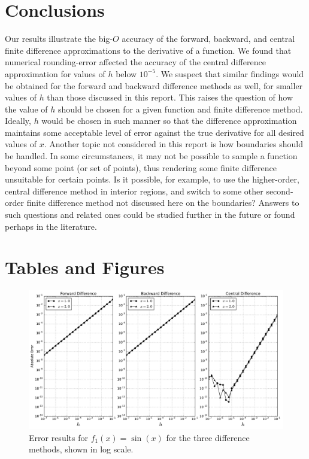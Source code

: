 \documentclass[11pt]{article}
\begin{document}
\section{Conclusions}

Our results illustrate the big-$O$ accuracy of the forward, backward, and central finite difference approximations to the derivative of a function. We found that numerical rounding-error affected the accuracy of the  central difference approximation for values of $h$ below $10^{-5}$. We suspect that similar findings would be obtained for the forward and backward difference methods as well, for smaller values of $h$ than those discussed in this report. This raises the question of how the value of $h$ should be chosen for a given function and finite difference method. Ideally, $h$ would be chosen in such manner so that the difference approximation maintains some acceptable level of error against the true derivative for all desired values of $x$. Another topic not considered in this report is how boundaries should be handled. In some circumstances, it may not be possible to sample a function beyond some point (or set of points), thus rendering some finite difference unsuitable for certain points. Is it possible, for example, to use the higher-order, central difference method in interior regions, and switch to some other second-order finite difference method not discussed here on the boundaries? Answers to such questions and related ones could be studied further in the future or found perhaps in the literature.

\section{Tables and Figures}

\begin{figure}[!h]
    \centering
    \includegraphics[width=\textwidth]{../figures/f1.pdf}
    \caption{Error results for $f_1(x) = \sin(x)$ for the three difference methods, shown in log scale.}
    \label{fig:func1-results}
\end{figure}
\end{document}
